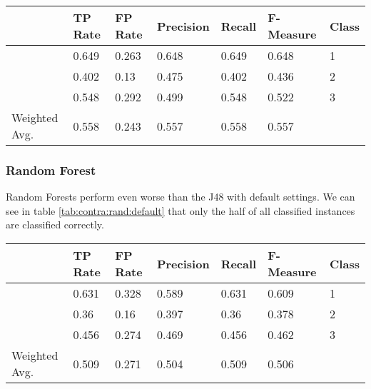 \documentclass[paper=a4, fontsize=11pt]{scrartcl} %
\numberwithin{equation}{section} %
\numberwithin{figure}{section} %
\numberwithin{table}{section} %
\begin{document}
\begin{table*}[htb]\centering
  \begin{tabular*}{\columnwidth}{@{}lllllll@{}}
      \toprule 
               &  TP Rate & FP Rate & Precision & Recall & F-Measure &  Class \\ \midrule   
               &  0.649   & 0.263   & 0.648     & 0.649  & 0.648     &  1     \\    
               &  0.402   & 0.13    & 0.475     & 0.402  & 0.436     &  2     \\        
               &  0.548   & 0.292   & 0.499     & 0.548  & 0.522     &  3     \\    
Weighted Avg.  &  0.558   & 0.243   & 0.557     & 0.558  & 0.557     &        \\ \bottomrule 
    \end{tabular*}
\caption{Decision Tree on Contraceptive Data Set -- using binary splits} 
\label{tab:contra:dec:bin}
\end{table*}
\FloatBarrier

\subsubsection{Random Forest}
Random Forests perform even worse than the J48 with default settings. We can see in table \ref{tab:contra:rand:default} that only the half of all classified instances are classified correctly.

\begin{table*}[htb]\centering
  \begin{tabular*}{\columnwidth}{@{}lllllll@{}}
      \toprule 
               &  TP Rate & FP Rate & Precision & Recall & F-Measure  & Class  \\  \midrule      
               &  0.631   & 0.328   & 0.589     & 0.631  & 0.609      & 1      \\       
               &  0.36    & 0.16    & 0.397     & 0.36   & 0.378      & 2      \\       
               &  0.456   & 0.274   & 0.469     & 0.456  & 0.462      & 3      \\       
Weighted Avg.  &  0.509   & 0.271   & 0.504     & 0.509  & 0.506      &        \\  \bottomrule     
    \end{tabular*}
\caption{Random Forests on Contraceptive Data Set -- Default Settings} 
\label{tab:contra:rand:default}
\end{table*}
\FloatBarrier
\end{document}
